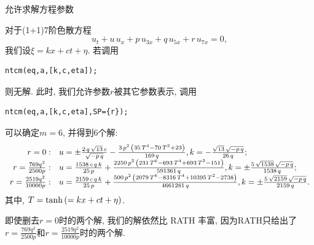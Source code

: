 \begin{example}允许求解方程参数

对于(1+1)7阶色散方程\cite{duffy1996travelling}
\begin{equation}
    {{u}_{t}}+u\,{{u}_{x}}+p\,{{u}_{3x}}+q\,{{u}_{5x}}+r\,{{u}_{7x}}=0,
\end{equation}
我们设$\xi=kx+ct+\eta$. 若调用
\begin{verbatim}
ntcm(eq,a,[k,c,eta]);
\end{verbatim}
则无解. 此时, 我们允许参数$r$被其它参数表示, 调用
\begin{verbatim}
ntcm(eq,a,[k,c,eta],SP={r});
\end{verbatim}
可以确定$m=6$, 并得到6个解:
\begin{equation}
\def\arraystretch{1.2}
\begin{array}{rl}
r=0:& u=\pm \frac{2\,q\,\sqrt {13}\,c}{\sqrt {-p\,q}}-\frac{3\,{p}^{2}\,\left( 35\,{T}^{4}-70\,{T}^{2}+23\right) }{169\,q},k=-\frac{\sqrt {13}\,\sqrt {-p\,q}}{26\,q};\\
r=\frac{769 q^2}{2500 p}:& u=\frac{1538\,c\,q\,k}{25\,p}+\frac{2250\,{p}^{2}\,\left( 231\,{T}^{6}-693\,{T}^{4}+693\,{T}^{2}-151\right) }{591361\,q},k=\pm \frac{5\,\sqrt {1538}\,\sqrt {-p\,q}}{1538\,q};\\
r=\frac{2519 q^2}{10000 p}:& u=\frac{2159\,c\,q\,k}{25\,p}+\frac{500\,{p}^{2}\,\left( 2079\,{T}^{6}-8316\,{T}^{4}+10395\,{T}^{2}-2738\right) }{4661281\,q},k=\pm\frac{5\,\sqrt {2159}\,\sqrt {-p\,q}}{2159\,q}.\\
\end{array}
\end{equation}
其中, $T=\tanh\left(=kx+ct+\eta\right)$. 

即使删去$r=0$时的两个解, 我们的解依然比 RATH\cite[p21]{liu2001master} 丰富, 因为RATH只给出了$r=\frac{769 q^2}{2500 p}$和$r=\frac{2519 q^2}{10000 p}$时的两个解.
\end{example}

